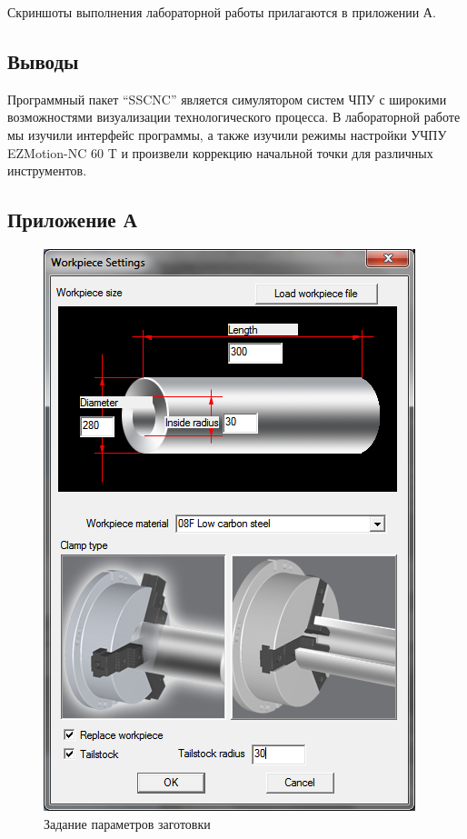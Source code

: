 Скриншоты выполнения лабораторной работы прилагаются в приложении А.

\subsection*{Выводы}

Программный пакет ``SSCNC'' является симулятором систем ЧПУ с широкими возможностями визуализации технологического процесса. В лабораторной работе мы изучили интерфейс программы, а также изучили режимы настройки УЧПУ EZMotion-NC 60 T и произвели коррекцию начальной точки для различных инструментов.

\clearpage

\subsection*{Приложение А}

\begin{figure}[ht]
\centering
	\includegraphics[scale=0.55]{1.png}
    \caption{Задание параметров заготовки\label{fig:zag}}
\end{figure}

